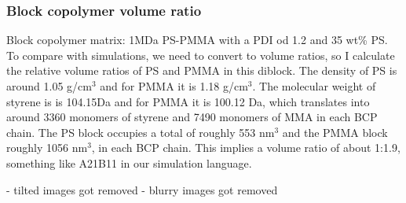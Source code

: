 \subsubsection{Block copolymer volume ratio}

Block copolymer matrix: 1MDa PS-PMMA with a PDI od 1.2 and 35 wt\% PS. To compare with simulations, we need to convert to volume ratios, so I calculate the relative volume ratios of PS and PMMA in this diblock. The density of PS is around 1.05 g/cm$^3$ and for PMMA it is 1.18 g/cm$^3$. The molecular weight of styrene is is 104.15Da and for PMMA it is 100.12 Da, which translates into around 3360 monomers of styrene and 7490 monomers of MMA in each BCP chain. The PS block occupies a total of roughly 553 nm$^3$ and the PMMA block roughly 1056 nm$^3$, in each BCP chain. This implies a volume ratio of about 1:1.9, something like A21B11 in our simulation language.

- tilted images got removed
- blurry images got removed